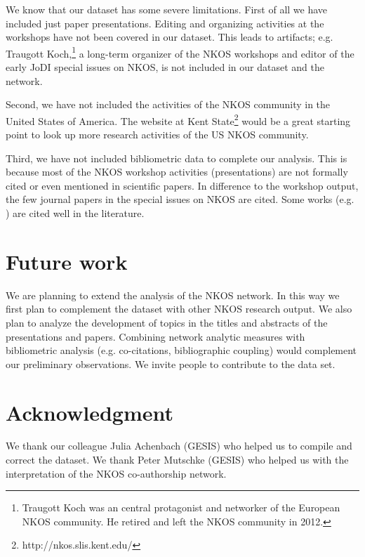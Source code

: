 \documentclass[runningheads,a4paper]{llncs}
\begin{document}

We know that our dataset has some severe limitations. 
First of all we have included just paper presentations. Editing and organizing activities at the workshops have not been covered in our dataset. This leads to artifacts; e.g. Traugott Koch,\footnote{Traugott Koch was an central protagonist and networker of the European NKOS community. He retired and left the NKOS community in 2012.} a long-term organizer of the NKOS workshops and editor of the early JoDI special issues on NKOS, is not included in our dataset and the network. 

Second, we have not included the activities of the NKOS community in the United States of America. The website at Kent State\footnote{http://nkos.slis.kent.edu/} would be a great starting point to look up more research activities of the US NKOS community.

Third, we have not included bibliometric data to complete our analysis. This is because most of the NKOS workshop activities (presentations) are not formally cited or even mentioned in scientific papers. In difference to the workshop output, the few journal papers in the special issues on NKOS are cited. Some works (e.g. \cite{SPCranefield2001,SPDoerr2001,SPTudhope2001,SPSoergel2004,SPTrant2006}) are cited well in the literature. 



\section{Future work}\label{future}
We are planning to extend the analysis of the NKOS network. In this way we first plan to complement the dataset with other NKOS research output. We also plan to analyze the development of topics in the titles and abstracts of the presentations and papers. Combining network analytic measures with bibliometric analysis (e.g. co-citations, bibliographic coupling) would complement our preliminary observations. We invite people to contribute to the data set.

\section{Acknowledgment}\label{sec:ACKNOWLEDGMENTS}
We thank our colleague Julia Achenbach (GESIS) who helped us to compile and correct the dataset. We thank Peter Mutschke (GESIS) who helped us with the interpretation of the NKOS co-authorship network. 


 
\end{document}
